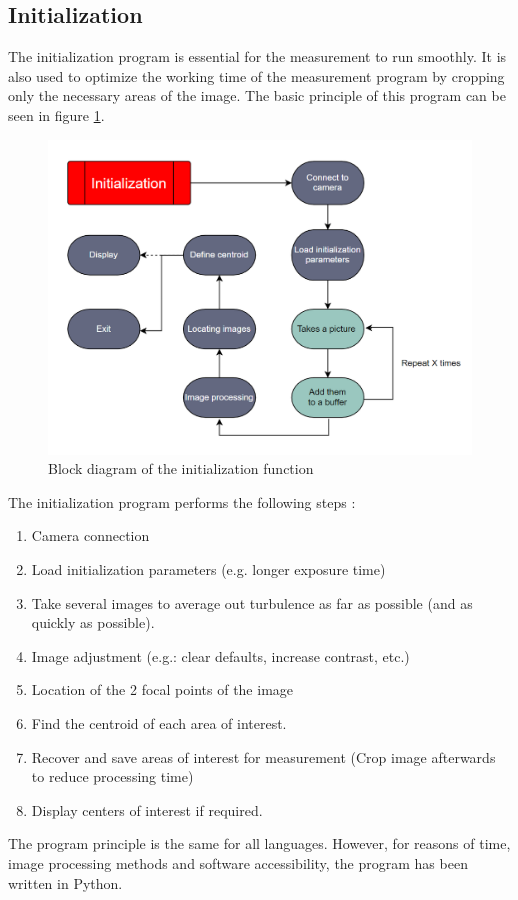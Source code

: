 \subsection{Initialization}
The initialization program is essential for the measurement to run smoothly. It is also used to optimize the working
time of the measurement program by cropping only the necessary areas of the image. The basic principle of this program
can be seen in figure \ref{fig:Soft_Init}.
\begin{figure}[H]
    \centering
    \includegraphics[scale=0.85]{assets/figures/Software/Initialization.png}
    \caption{Block diagram of the initialization function}
    \label{fig:Soft_Init}
\end{figure}
The initialization program performs the following steps :
\begin{enumerate}
    \item Camera connection
    \item Load initialization parameters (e.g. longer exposure time)
    \item Take several images to average out turbulence as far as possible (and as quickly as possible).
    \item Image adjustment (e.g.: clear defaults, increase contrast, etc.)
    \item Location of the 2 focal points of the image
    \item Find the centroid of each area of interest.
    \item Recover and save areas of interest for measurement (Crop image afterwards to reduce processing time)
    \item Display centers of interest if required.
\end{enumerate}
The program principle is the same for all languages. However, for reasons of time, image processing methods and
software accessibility, the program has been written in Python.
\newpage
